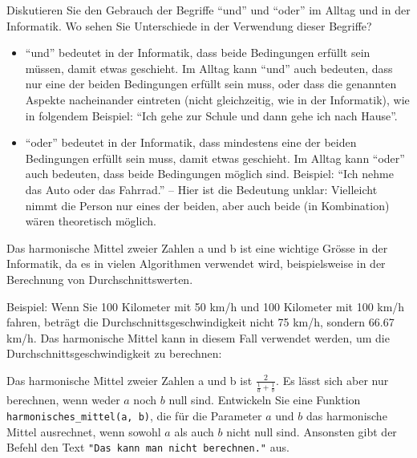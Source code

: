 \begin{mychallenge}
	Diskutieren Sie den Gebrauch der Begriffe \enquote{und} und \enquote{oder} im Alltag und in der Informatik. Wo sehen Sie Unterschiede in der Verwendung dieser Begriffe?
	\begin{myanswer}
		\begin{itemize}
			\item \enquote{und} bedeutet in der Informatik, dass beide Bedingungen erfüllt sein müssen, damit etwas geschieht. Im Alltag kann \enquote{und} auch bedeuten, dass nur eine der beiden Bedingungen erfüllt sein muss, oder dass die genannten Aspekte nacheinander eintreten (nicht gleichzeitig, wie in der Informatik), wie in folgendem Beispiel: \enquote{Ich gehe zur Schule und dann gehe ich nach Hause}.
			\item \enquote{oder} bedeutet in der Informatik, dass mindestens eine der beiden Bedingungen erfüllt sein muss, damit etwas geschieht. Im Alltag kann \enquote{oder} auch bedeuten, dass beide Bedingungen möglich sind. Beispiel: \enquote{Ich nehme das Auto oder das Fahrrad.} -- Hier ist die Bedeutung unklar: Vielleicht nimmt die Person nur eines der beiden, aber auch beide (in Kombination) wären theoretisch möglich.
		\end{itemize}
	\end{myanswer}
\end{mychallenge}

\begin{mychallenge}
	Das harmonische Mittel zweier Zahlen a und b ist eine wichtige Grösse in der Informatik, da es in vielen Algorithmen verwendet wird, beispielsweise in der Berechnung von Durchschnittswerten.

	Beispiel: Wenn Sie 100 Kilometer mit 50 km/h und 100 Kilometer mit 100 km/h fahren, beträgt die Durchschnittsgeschwindigkeit nicht 75 km/h, sondern 66.67 km/h. Das harmonische Mittel kann in diesem Fall verwendet werden, um die Durchschnittsgeschwindigkeit zu berechnen:

	Das harmonische Mittel zweier Zahlen a und b ist $\frac{2}{\frac{1}{a}+\frac{1}{b}}$. Es lässt sich aber nur berechnen, wenn weder $a$ noch $b$ null sind. Entwickeln Sie eine Funktion \lstinline|harmonisches_mittel(a, b)|, die für die Parameter $a$ und $b$ das harmonische Mittel ausrechnet, wenn sowohl $a$ als auch $b$ nicht null sind. Ansonsten gibt der Befehl den Text \lstinline|"Das kann man nicht berechnen."| aus.

	\begin{myanswer}
		
	\end{myanswer}
\end{mychallenge}

